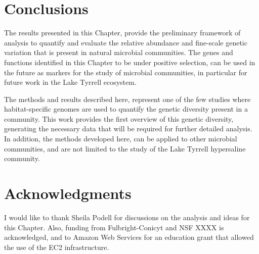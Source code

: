 \section{Conclusions}

The results presented in this Chapter, provide the preliminary framework of analysis to quantify and evaluate the relative abundance and fine-scale genetic variation that is present in natural microbial communities. The genes and functions identified in this Chapter to be under positive selection, can be used in the future as markers for the study of microbial communities, in particular for future work in the Lake Tyrrell ecosystem. 

The methods and results described here, represent one of the few studies where habitat-specific genomes are used to quantify the genetic diversity present in a community. This work provides the first overview of this genetic diversity, generating the necessary data that will be required for further detailed analysis. In addition, the methods developed here, can be applied to other microbial communities, and are not limited to the study of the Lake Tyrrell hypersaline community.

\section{Acknowledgments}
I would like to thank Sheila Podell for discussions on the analysis and ideas for this Chapter. Also, funding from Fulbright-Conicyt and NSF XXXX is acknowledged, and to Amazon Web Services for an education grant that allowed the use of the EC2 infrastructure.






